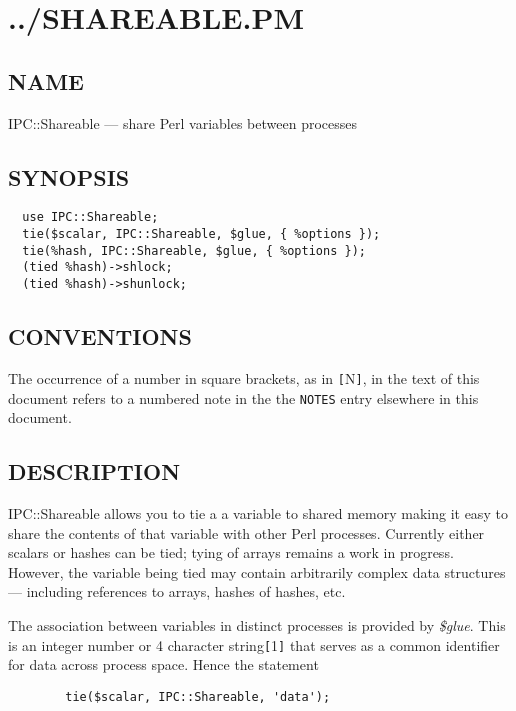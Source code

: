 
\section{../SHAREABLE.PM}%

\subsection*{NAME}
IPC::Shareable --- share Perl variables between processes

\subsection*{SYNOPSIS}\begin{verbatim}
  use IPC::Shareable;
  tie($scalar, IPC::Shareable, $glue, { %options });
  tie(%hash, IPC::Shareable, $glue, { %options });
  (tied %hash)->shlock;
  (tied %hash)->shunlock;
\end{verbatim}

\subsection*{CONVENTIONS}%

The occurrence of a number in square brackets, as in {\tt [}N{\tt ]}, in the text
of this document refers to a numbered note in the the {\tt NOTES} entry elsewhere in this document.

\subsection*{DESCRIPTION}
IPC::Shareable allows you to tie a a variable to shared memory making
it easy to share the contents of that variable with other Perl
processes.  Currently either scalars or hashes can be tied; tying of
arrays remains a work in progress.  However, the variable being tied
may contain arbitrarily complex data structures --- including references
to arrays, hashes of hashes, etc.

The association between variables in distinct processes is provided by
{\em \$glue\/}.  This is an integer number or 4 character string{\tt [}1{\tt ]} that serves
as a common identifier for data across process space.  Hence the
statement
\begin{verbatim}
        tie($scalar, IPC::Shareable, 'data');
\end{verbatim}

